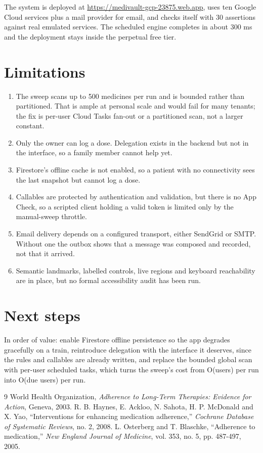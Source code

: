 \documentclass[11pt,a4paper]{report}
\newcommand{\appurl}{\url{https://medivault-gcp-23875.web.app}}
\begin{document}
The system is deployed at \appurl, uses ten Google Cloud services plus a mail provider for email, and checks
itself with 30 assertions against real emulated services. The scheduled engine completes in about 300 ms
and the deployment stays inside the perpetual free tier.

\section{Limitations}
\label{sec:limitations}

\begin{enumerate}
  \item The sweep scans up to 500 medicines per run and is bounded rather than partitioned. That is ample
        at personal scale and would fail for many tenants; the fix is per-user Cloud Tasks fan-out or a
        partitioned scan, not a larger constant.
  \item Only the owner can log a dose. Delegation exists in the backend but not in the interface, so a
        family member cannot help yet.
  \item Firestore's offline cache is not enabled, so a patient with no connectivity sees the last
        snapshot but cannot log a dose.
  \item Callables are protected by authentication and validation, but there is no App Check, so a scripted
        client holding a valid token is limited only by the manual-sweep throttle.
  \item Email delivery depends on a configured transport, either SendGrid or SMTP. Without one the outbox
        shows that a message was composed and recorded, not that it arrived.
  \item Semantic landmarks, labelled controls, live regions and keyboard reachability are in place, but no
        formal accessibility audit has been run.
\end{enumerate}

\section{Next steps}

In order of value: enable Firestore offline persistence so the app degrades gracefully on a train,
reintroduce delegation with the interface it deserves, since the rules and callables are already
written, and replace the bounded global scan with per-user scheduled tasks, which turns the sweep's cost
from O(users) per run into O(due users) per run.

\begin{thebibliography}{9}
 World Health Organization, \emph{Adherence to Long-Term Therapies: Evidence for
Action}, Geneva, 2003.
 R. B. Haynes, E. Ackloo, N. Sahota, H. P. McDonald and X. Yao, ``Interventions for
enhancing medication adherence,'' \emph{Cochrane Database of Systematic Reviews}, no. 2, 2008.
 L. Osterberg and T. Blaschke, ``Adherence to medication,'' \emph{New England
Journal of Medicine}, vol. 353, no. 5, pp. 487-497, 2005.
\end{thebibliography}
\end{document}
